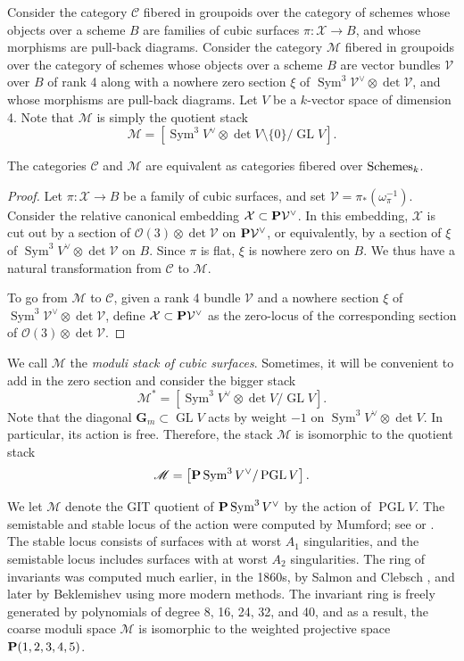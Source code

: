 \documentclass[reqno]{amsart}
\renewcommand{\k}{k}
\renewcommand{\to}{{\longrightarrow}}
\renewcommand {\P}{{\bf P}}
\providecommand{\GL}{\operatorname{GL}}
\providecommand{\PGL}{\operatorname{PGL}}
\providecommand{\Sym}{\operatorname{Sym}}
\numberwithin{equation}{section}
\renewcommand{\O}{\mathcal{O}}
\newcommand{\G}{\mathbf{G}}
\newcommand{\cX}{\mathcal{X}}
\begin{document}
Consider the category $\mathscr {C}$ fibered in groupoids over the
category of schemes whose objects over a scheme $B$ are families of
cubic surfaces $\pi \colon \cX \to B$, and whose morphisms are pull-back
diagrams.  Consider the category $\mathscr {M}$ fibered in groupoids
over the category of schemes whose objects over a scheme $B$ are
vector bundles $\mathcal{V}$ over $B$ of rank 4 along with a nowhere
zero section $\xi$ of
$\Sym^3 \mathcal{V}^{\vee} \otimes \det \mathcal{V}$, and whose morphisms
are pull-back diagrams.  Let $V$ be a $\k$-vector space of dimension
4.  Note that $\mathscr{M}$ is simply the quotient stack
\[\mathscr{M} = \left[\Sym^3 V^{\vee} \otimes \det V \setminus \{0\} / \GL V \right]. \]
\begin{proposition}\label{prop:cubicstack}
  The categories $\mathscr{C}$ and $\mathscr{M}$ are equivalent as categories fibered over ${\rm Schemes}_k$.
\end{proposition}
\begin{proof}
  Let $\pi \colon \cX \to B$ be a family of cubic surfaces, and set
  $\mathcal{V} = \pi_* \left( \omega_{\pi}^{-1} \right)$.  Consider the
  relative canonical embedding $\cX \subset \P \mathcal{V}^{\vee}$.  In
  this embedding, $\cX$ is cut out by a section of
  $\O(3) \otimes \det \mathcal{V}$ on $\P \mathcal{V}^{\vee}$, or
  equivalently, by a section of $\xi$ of
  $\Sym^3V^{\vee} \otimes \det \mathcal{V}$ on $B$.  Since $\pi$ is flat,
  $\xi$ is nowhere zero on $B$.  We thus have a natural transformation
  from $\mathscr{C}$ to $\mathscr{M}$.

  To go from $\mathscr{M}$ to $\mathscr{C}$, given a rank 4 bundle $\mathcal{V}$ and a nowhere section $\xi$ of $\Sym^3 \mathcal{V}^{\vee} \otimes \det \mathcal{V}$, define $\cX \subset \P \mathcal{V}^{\vee}$ as the zero-locus of the corresponding section of $\O(3) \otimes \det \mathcal{V}$.
\end{proof}

We call $\mathscr{M}$ the \emph{moduli stack of cubic surfaces}.
Sometimes, it will be convenient to add in the zero section and consider the bigger stack
\[ \mathscr{M}^* = \left[\Sym^3 V^{\vee} \otimes \det V / \GL V \right].\]
Note that the diagonal $\G_m \subset \GL V$ acts by weight $-1$ on $\Sym^3 V^{\vee} \otimes \det V$.
In particular, its action is free.
Therefore, the stack $\mathscr{M}$ is isomorphic to the quotient stack
\[ \mathscr{M} = \left[ \P \Sym^3V^{\vee} / \PGL V \right].\]

We let $\mathcal{M}$ denote the GIT quotient of $\P \Sym^3V^{\vee}$ by
the action of $\PGL V$.  The semistable and stable locus of the
action were computed by Mumford; see \cite[Chapter 4, \S
2]{mum.fog.kir:94} or \cite[1.14]{mum:77}.  The stable locus consists
of surfaces with at worst $A_1$ singularities, and the semistable
locus includes surfaces with at worst $A_2$ singularities.  The ring
of invariants was computed much earlier, in the 1860s, by Salmon
\cite{sal:60} and Clebsch \cite{cle:61,cle:61*1}, and later by
Beklemishev \cite{bek:82} using more modern methods.  The invariant
ring is freely generated by polynomials of degree 8, 16, 24, 32, and
40, and as a result, the coarse moduli space $\mathcal{M}$ is
isomorphic to the weighted projective space $\P(1,2,3,4,5)$.
\end{document}
